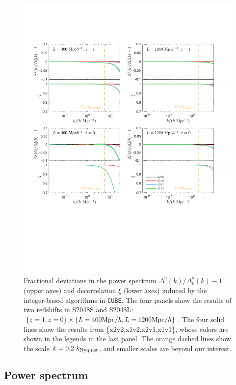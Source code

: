 \documentclass[10pt,twocolumn,preprint]{emulateapj}
\begin{document}
\begin{figure}
\centering
  \includegraphics[width=1.0\linewidth]{diff_power.pdf}
 \caption{Fractional deviations in the power spectrum $\Delta^2(k)/\Delta^2_0(k)-1$ (upper axes) and decorrelation $\xi$ (lower axes) induced by the integer-based algorithms in {\tt CUBE}. The four panels show the results of two redshifts in S2048S and S2048L: $\{ z=1, z=0 \} \times \{ L=400{\rm Mpc}/h, L=1200{\rm Mpc}/h \}$. The four solid lines show the results from \{x2v2,x1v2,x2v1,x1v1\}, whose colors are shown in the legends in the last panel. The orange dashed lines show the scale $k=0.2\ k_{\rm Nyquist}$, and smaller scales are beyond our interest.}
\label{fig.ccc}
\end{figure}
\subsection{Power spectrum}
\end{document}
